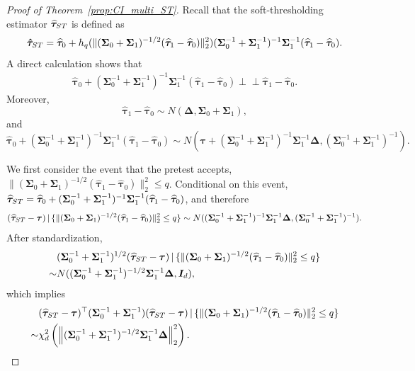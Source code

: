 \documentclass[10pt,a4paper]{amsart}
\def\given{\,|\,}
\newcommand{\htau}{\widehat\tau}
\newcommand{\indep}{\perp \!\!\!\perp}
\begin{document}
\begin{proof}[Proof of Theorem~\ref{prop:CI_multi_ST}]
Recall that the soft-thresholding estimator $\bm{\htau}_{\rm ST}$ is defined as
\[
  \bm{\hat\tau}_{\rm ST} = \bm{\htau}_0 + h_q(\lVert (\bm{\Sigma}_0+ \bm{\Sigma}_1)^{-1/2}(\bm{\htau}_1 - \bm{\htau}_0) \rVert_2^2)(\bm{\Sigma}_0^{-1} + \bm{\Sigma}_1^{-1})^{-1}\bm{\Sigma}_1^{-1}(\bm{\htau}_1 - \bm{\htau}_0).
\]
A direct calculation shows that
\begin{align*}
  \bm{\htau}_0 + (\bm{\Sigma}_0^{-1} + \bm{\Sigma}_1^{-1})^{-1} \bm{\Sigma}_1^{-1} (\bm{\htau}_1 - \bm{\htau}_0) \indep \bm{\htau}_1 - \bm{\htau}_0.
\end{align*}
Moreover,
\[
  \bm{\htau}_1 - \bm{\htau}_0 \sim N(\bm{\Delta}, \bm{\Sigma}_0+ \bm{\Sigma}_1),
\]
and
\[
  \bm{\htau}_0 + (\bm{\Sigma}_0^{-1} + \bm{\Sigma}_1^{-1})^{-1} \bm{\Sigma}_1^{-1} (\bm{\htau}_1 - \bm{\htau}_0) \sim N(\bm{\tau} + (\bm{\Sigma}_0^{-1} + \bm{\Sigma}_1^{-1})^{-1} \bm{\Sigma}_1^{-1} \bm{\Delta}, (\bm{\Sigma}_0^{-1} + \bm{\Sigma}_1^{-1})^{-1} ).
\]

We first consider the event that the pretest accepts, $\lVert (\bm{\Sigma}_0+ \bm{\Sigma}_1)^{-1/2}(\bm{\htau}_1 - \bm{\htau}_0) \rVert_2^2 \le q$. Conditional on this event, $\bm{\htau}_{\rm ST} = \bm{\htau}_0 + (\bm{\Sigma}_0^{-1} + \bm{\Sigma}_1^{-1})^{-1} \bm{\Sigma}_1^{-1} (\bm{\htau}_1 - \bm{\htau}_0) $, and therefore
\begin{align*}
  (\bm{\htau}_{\rm ST} - \bm{\tau}) \given \{\lVert (\bm{\Sigma}_0+ \bm{\Sigma}_1)^{-1/2}(\bm{\htau}_1 - \bm{\htau}_0) \rVert_2^2 \le q\} \sim N((\bm{\Sigma}_0^{-1} + \bm{\Sigma}_1^{-1})^{-1} \bm{\Sigma}_1^{-1} \bm{\Delta}, (\bm{\Sigma}_0^{-1} + \bm{\Sigma}_1^{-1})^{-1} ).
\end{align*}
After standardization,
\begin{align*}
  &(\bm{\Sigma}_0^{-1} + \bm{\Sigma}_1^{-1})^{1/2} (\bm{\htau}_{\rm ST} - \bm{\tau}) \given \{\lVert (\bm{\Sigma}_0+ \bm{\Sigma}_1)^{-1/2}(\bm{\htau}_1 - \bm{\htau}_0) \rVert_2^2 \le q\} \\
  \sim& N((\bm{\Sigma}_0^{-1} + \bm{\Sigma}_1^{-1})^{-1/2} \bm{\Sigma}_1^{-1} \bm{\Delta}, \bm{I}_d),
\end{align*}
which implies
\begin{align*}
  &(\bm{\htau}_{\rm ST} - \bm{\tau})^\top (\bm{\Sigma}_0^{-1} + \bm{\Sigma}_1^{-1}) (\bm{\htau}_{\rm ST} - \bm{\tau}) \given \{\lVert (\bm{\Sigma}_0+ \bm{\Sigma}_1)^{-1/2}(\bm{\htau}_1 - \bm{\htau}_0) \rVert_2^2 \le q\} \\
  \sim& \chi^2_d\left(\left\lVert (\bm{\Sigma}_0^{-1} + \bm{\Sigma}_1^{-1})^{-1/2} \bm{\Sigma}_1^{-1} \bm{\Delta}\right\rVert_2^2\right).
\end{align*}


\end{proof}
\end{document}
